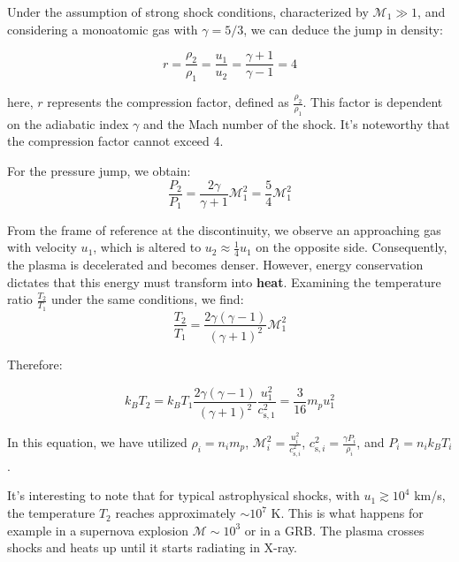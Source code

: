 Under the assumption of strong shock conditions, characterized by \( \mathcal{M}_1 \gg 1 \), and considering a monoatomic gas with \( \gamma = 5/3 \), we can deduce the jump in density:
%
\begin{remark}
\begin{equation}
r = \frac{\rho_2}{\rho_1} = \frac{u_1}{u_2} = \frac{\gamma + 1}{\gamma - 1} = 4
\end{equation}
\end{remark}
%
here, \( r \) represents the compression factor, defined as \( \frac{\rho_2}{\rho_1} \). This factor is dependent on the adiabatic index \( \gamma \) and the Mach number of the shock. It's noteworthy that the compression factor cannot exceed 4.

For the pressure jump, we obtain:
%
\begin{equation}
\frac{P_2}{P_1} = \frac{2 \gamma}{\gamma + 1} \mathcal{M}_1^2 = \frac{5}{4} \mathcal{M}_1^2 
\end{equation}

From the frame of reference at the discontinuity, we observe an approaching gas with velocity \( u_1 \), which is altered to \( u_2 \approx \frac{1}{4}u_1 \) on the opposite side. Consequently, the plasma is decelerated and becomes denser.
%
However, energy conservation dictates that this energy must transform into \textbf{heat}. Examining the temperature ratio \( \frac{T_2}{T_1} \) under the same conditions, we find:
%
\begin{equation}
\frac{T_2}{T_1} = \frac{2 \gamma (\gamma - 1)}{(\gamma +1)^2} \mathcal{M}_1^2
\end{equation}

Therefore:
%
\begin{remark}
\begin{equation}
k_B T_2 = k_B T_1 \frac{2 \gamma (\gamma - 1)}{(\gamma +1)^2} \frac{u_1^2}{c_{\text{s},1}^2} = \frac{3}{16} m_p u_1^2
\end{equation}
\end{remark}

In this equation, we have utilized \( \rho_i = n_i m_p \), \( \mathcal{M}_i^2 = \frac{u_i^2}{c_{\text{s},i}^2} \), \( c_{\text{s},i}^2 = \frac{\gamma P_i}{\rho_i} \), and \( P_i = n_i k_B T_i \).

It's interesting to note that for typical astrophysical shocks, with \( u_1 \gtrsim 10^4 \) km/s, the temperature \( T_2 \) reaches approximately \( \sim 10^7 \) K.
%
This is what happens for example in a supernova explosion \( \mathcal M \sim 10^3 \) or in a GRB.  The plasma crosses shocks and heats up until it starts radiating in X-ray.

